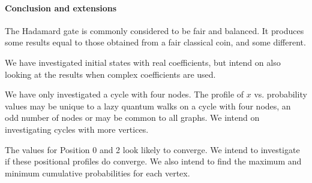 \documentclass[a0,portrait]{a0poster}
\begin{document}
\begin{center}
{\paragraph{Conclusion and extensions}

The Hadamard gate is commonly considered to be fair and balanced. It produces some results equal to those obtained from a fair classical coin, and some different.

We have investigated initial states with real coefficients, but intend on also looking at the results when complex coefficients are used.

We have only investigated a cycle with four nodes. The profile of $x$ vs. probability values may be unique to a lazy quantum walks on a cycle with four nodes, an odd number of nodes or may be common to all graphs. We intend on investigating cycles with more vertices.

The values for Position 0 and 2 look likely to converge. We intend to investigate if these positional profiles do converge. We also intend to find the maximum and minimum cumulative probabilities for each vertex.


}
\end{center}


\makefooter
\end{document}
